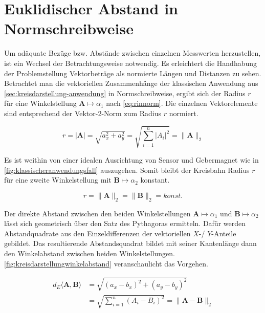 %

\section{Euklidischer Abstand in Normschreibweise}\label{sec:euklidischer-abstand}


Um adäquate Bezüge bzw. Abstände zwischen einzelnen Messwerten herzustellen, ist ein Wechsel der Betrachtungsweise notwendig. Es erleichtert die Handhabung der Problemstellung Vektorbeträge als normierte Längen und Distanzen zu sehen. Betrachtet man die vektoriellen Zusammenhänge der klassischen Anwendung aus \autoref{sec:kreisdarstellung-anwendung} in Normschreibweise, ergibt sich der Radius $r$ für eine Winkelstellung $\mathbf{A}\mapsto\alpha_1$ nach \autoref{eq:rinnorm}. Die einzelnen Vektorelemente sind entsprechend der Vektor-2-Norm \cite{vandeGeijn2014} zum Radius $r$ normiert.


\begin{equation}\label{eq:rinnorm}
r = |\mathbf{A}| =\sqrt{a_x^2 + a_y^2} = \sqrt{\sum_{i=1}^{n}|A_i|^2} = \|\mathbf{A}\|_2
\end{equation}


Es ist weithin von einer idealen Ausrichtung von Sensor und Gebermagnet wie in \autoref{fig:klassischeranwendungsfall} auszugehen. Somit bleibt der Kreisbahn Radius $r$ für eine zweite Winkelstellung mit $\mathbf{B}\mapsto\alpha_2$ konstant.


\begin{equation}
r = \|\mathbf{A}\|_2 = \|\mathbf{B}\|_2 = konst.
\end{equation}


Der direkte Abstand zwischen den beiden Winkelstellungen $\mathbf{A}\mapsto\alpha_1$ und $\mathbf{B}\mapsto\alpha_2$ lässt sich geometrisch über den Satz des Pythagoras ermitteln. Dafür werden Abstandquadrate aus den Einzeldifferenzen der vektoriellen $X$-/ $Y$-Anteile gebildet. Das resultierende Abstandsquadrat bildet mit seiner Kantenlänge dann den Winkelabstand zwischen beiden Winkelstellungen. \autoref{fig:kreisdarstellungwinkelabstand} veranschaulicht das Vorgehen.


\begin{align}\label{eq:deinnorm}
d_E\langle\mathbf{A},\mathbf{B}\rangle &= \sqrt{(a_x - b_x)^2 + (a_y - b_y)^2} \nonumber \\
&= \sqrt{\sum_{i=1}^{n}(A_i - B_i)^2} = \|\mathbf{A} - \mathbf{B}\|_2
\end{align}


